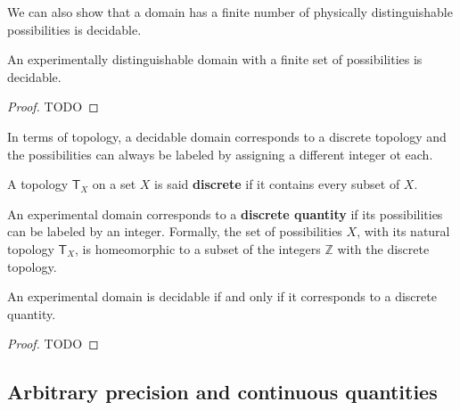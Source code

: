 \documentclass[11pt,letterpaper,fleqn]{memoir} %
\begin{document}
We can also show that a domain has a finite number of physically distinguishable possibilities is decidable.

\begin{mathSection}
	
	\begin{prop}
		An experimentally distinguishable domain with a finite set of possibilities is decidable.
	\end{prop}
	
	\begin{proof}
		TODO
	\end{proof}
	
\end{mathSection}

In terms of topology, a decidable domain corresponds to a discrete topology and the possibilities can always be labeled by assigning a different integer ot each.

\begin{mathSection}
	
	\begin{defn}
		A topology $\mathsf{T}_X$ on a set $X$ is said \textbf{discrete} if it contains every subset of $X$.
	\end{defn}
	
	\begin{defn}
		An experimental domain corresponds to a \textbf{discrete quantity} if its possibilities can be labeled by an integer. Formally, the set of possibilities $X$, with its natural topology $\mathsf{T}_X$, is homeomorphic to a subset of the integers $\mathbb{Z}$ with the discrete topology.
	\end{defn}
	
	\begin{prop}
		An experimental domain is decidable if and only if it corresponds to a discrete quantity.
	\end{prop}
	
	\begin{proof}
		TODO
	\end{proof}	
\end{mathSection}

\subsection{Arbitrary precision and continuous quantities}
\end{document}

